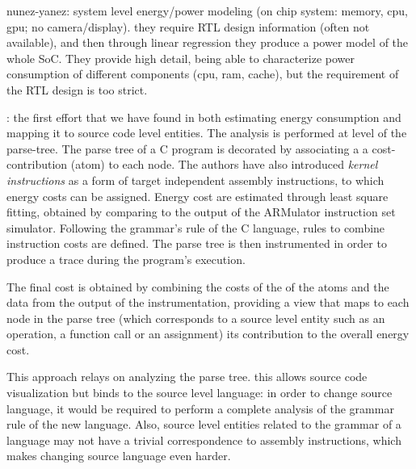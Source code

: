 nunez-yanez: system level energy/power modeling (on chip system: memory, cpu, gpu; no camera/display). they require RTL design information (often not available), and then through linear regression they produce a power model of the whole SoC. They provide high detail, being able to characterize power consumption of different components (cpu, ram, cache), but the requirement of the RTL design is too strict. 

\cite{brando2008}: the first effort that we have found in both estimating energy consumption and mapping it to source code level entities. The analysis is performed at level of the parse-tree. The parse tree of a C program is decorated by associating a a cost-contribution (atom) to each node. The authors have also introduced \emph{kernel instructions} as a form of target independent assembly instructions, to which energy costs can be assigned. Energy cost are estimated through least square fitting, obtained by comparing to the output of the ARMulator instruction set simulator. Following the grammar's rule of the C language, rules to combine instruction costs are defined. The parse tree is then instrumented in order to produce a trace during the program's execution. \par 
The final cost is obtained by combining the costs of the of the atoms and the data from the output of the instrumentation, providing a view that maps to each node in the parse tree (which corresponds to a source level entity such as an operation, a function call or an assignment) its contribution to the overall energy cost. \par 
This approach relays on analyzing the parse tree. this allows source code visualization but binds to the source level language: in order to change source language, it would be required to perform a complete analysis of the grammar rule of the new language. Also, source level entities related to the grammar of a language may not have a trivial correspondence to assembly instructions, which makes changing source language even harder.

